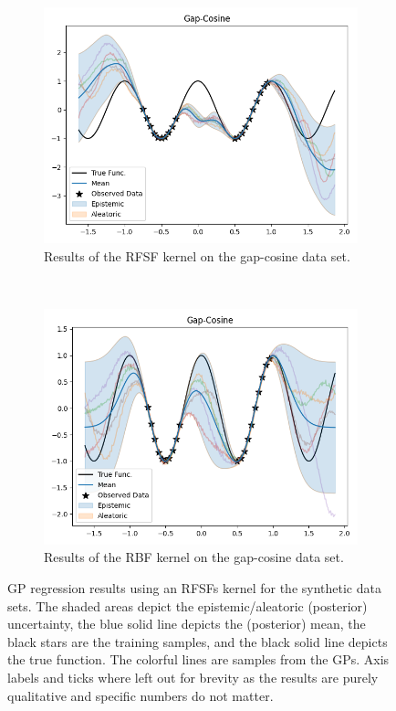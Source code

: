 \begin{figure}
\begin{subfigure}{0.49\linewidth}
        \includegraphics[width=\linewidth, height=0.618033988749895\linewidth]{graphics/generated/gp-gapcosine-rfsf.png}  %
        \caption{Results of the \acs{RFSF} kernel on the gap-cosine data set.}
    \end{subfigure}
	~
    \begin{subfigure}{0.49\linewidth}
        \centering
        \includegraphics[width=\linewidth, height=0.618033988749895\linewidth]{graphics/generated/gp-gapcosine-rbf.png}  %
        \caption{Results of the \acs{RBF} kernel on the gap-cosine data set.}
    \end{subfigure}
    \caption{
        \acl{GP} regression results using an \acsp{RFSF} kernel for the synthetic data sets.
        The shaded areas depict the epistemic/aleatoric (posterior) uncertainty, the blue solid line depicts the (posterior) mean, the black stars are the training samples, and the black solid line depicts the true function.
        The colorful lines are samples from the \acsp{GP}.
        Axis labels and ticks where left out for brevity as the results are purely qualitative and specific numbers do not matter.
    }
    \label{fig:syntheticResultPlot}
\end{figure}

